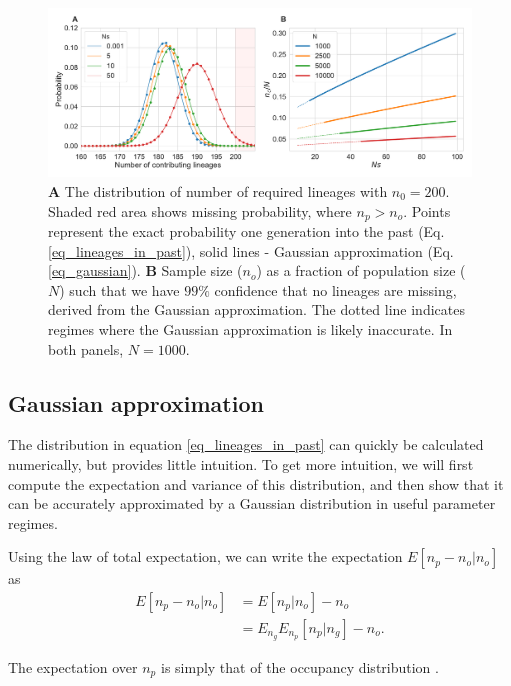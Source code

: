 \documentclass[review]{elsarticle}
\begin{document}
\begin{figure}
  \centering
  \includegraphics[width=\textwidth]{fig/combined.pdf}
  \caption{\textbf{A} The distribution of number of required lineages with $n_0=200$. Shaded
    red area shows missing probability, where $n_p > n_o$. Points represent the exact probability one
    generation into the past (Eq. \ref{eq_lineages_in_past}), solid lines - Gaussian approximation
    (Eq. \ref{eq_gaussian}). \textbf{B} Sample size ($n_o$) as a fraction of population size ($N$)
    such that we have $99\%$ confidence that no lineages are missing, derived from the Gaussian
    approximation. The dotted line indicates regimes where the Gaussian approximation is likely inaccurate. 
     In both panels, $N=1000$.}
  \label{fig_combined}
\end{figure}

\subsection{Gaussian approximation}
\label{subsec_gaussian}

The distribution in equation \ref{eq_lineages_in_past} can quickly be calculated numerically, but
provides little intuition. To get more intuition, we will first compute the
expectation and variance of this distribution, and then show that it can be accurately approximated by a
Gaussian distribution in useful parameter regimes.

Using the law of total expectation, we can write the expectation $E[n_p-n_o | n_o]$ as 
\begin{equation*}
  \begin{aligned}
    \label{eq_lineages_approx}
    E[n_p-n_o | n_o] &=        E[n_p | n_o]       - n_o \\
                     &=E_{n_g} E_{n_p}[n_p | n_g] - n_o.
  \end{aligned}
\end{equation*}

The expectation over $n_p$ is simply that of the occupancy distribution \cite{Wakeley2009}.
\end{document}
